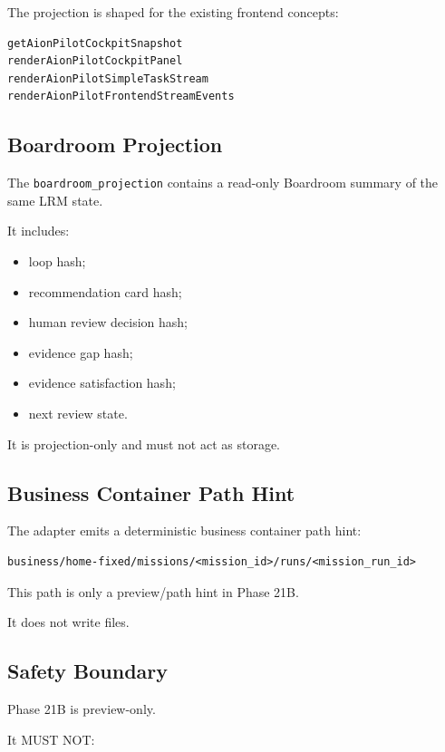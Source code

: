 The projection is shaped for the existing frontend concepts:

\begin{verbatim}
getAionPilotCockpitSnapshot
renderAionPilotCockpitPanel
renderAionPilotSimpleTaskStream
renderAionPilotFrontendStreamEvents
\end{verbatim}

\subsection{Boardroom Projection}

The \texttt{boardroom\_projection} contains a read-only Boardroom summary of the same LRM state.

It includes:

\begin{itemize}
  \item loop hash;
  \item recommendation card hash;
  \item human review decision hash;
  \item evidence gap hash;
  \item evidence satisfaction hash;
  \item next review state.
\end{itemize}

It is projection-only and must not act as storage.

\subsection{Business Container Path Hint}

The adapter emits a deterministic business container path hint:

\begin{verbatim}
business/home-fixed/missions/<mission_id>/runs/<mission_run_id>
\end{verbatim}

This path is only a preview/path hint in Phase 21B.

It does not write files.

\subsection{Safety Boundary}

Phase 21B is preview-only.

It MUST NOT:

